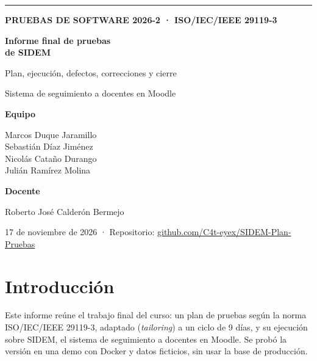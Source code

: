 \documentclass[11pt,a4paper,oneside]{report}
\newcommand{\code}[1]{\leavevmode{\ttfamily\color{tinta}#1}}
\begin{document}
\begin{titlepage}
\sffamily
\vspace*{1.2cm}
{\color{verde}\rule{0.9cm}{0.9cm}}\hspace{6pt}{\color{ambar}\rule{0.9cm}{0.9cm}}\hspace{6pt}{\color{rojo}\rule{0.9cm}{0.9cm}}\par
\vspace{1.4cm}
{\color{azul}\large\bfseries PRUEBAS DE SOFTWARE 2026-2 · ISO/IEC/IEEE 29119-3}\par
\vspace{0.4cm}
{\color{tinta}\fontsize{32}{38}\selectfont\bfseries Informe final de pruebas\\[4pt] de SIDEM}\par
\vspace{0.5cm}
{\color{gris}\Large Plan, ejecución, defectos, correcciones y cierre}\par
\vspace{0.3cm}
{\color{gris}\large Sistema de seguimiento a docentes en Moodle}\par
\vfill
{\color{tinta}\large\bfseries Equipo}\par\vspace{4pt}
{\color{tinta}\large Marcos Duque Jaramillo\\ Sebastián Díaz Jiménez\\ Nicolás Cataño Durango\\ Julián Ramírez Molina}\par
\vspace{0.8cm}
{\color{tinta}\large\bfseries Docente}\par\vspace{4pt}
{\color{tinta}\large Roberto José Calderón Bermejo}\par
\vspace{0.8cm}
{\color{gris}17 de noviembre de 2026 · Repositorio: \href{https://github.com/C4t-eyex/SIDEM-Plan-Pruebas}{github.com/C4t-eyex/SIDEM-Plan-Pruebas}}\par
\end{titlepage}


\tableofcontents\clearpage


\chapter*{Introducción}
Este informe reúne el trabajo final del curso: un plan de pruebas según la norma ISO/IEC/IEEE \mbox{29119-3}, adaptado (\emph{tailoring}) a un ciclo de 9 días, y su ejecución sobre SIDEM, el sistema de seguimiento a docentes en Moodle. Se probó la versión \code{77f71b2} en una demo con Docker y datos ficticios, sin usar la base de producción.
\end{document}
